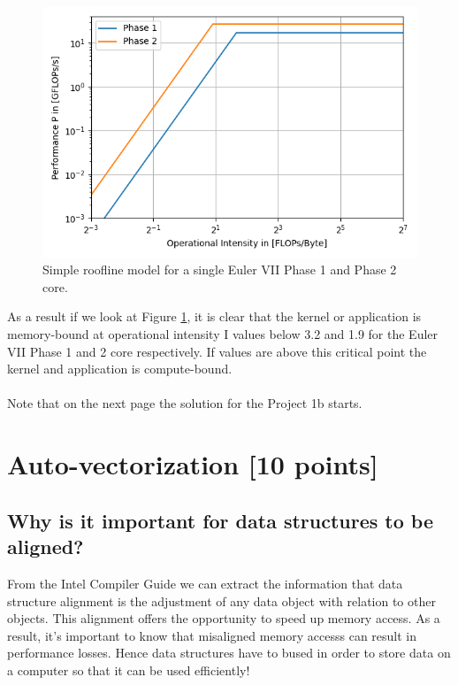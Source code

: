 \documentclass[unicode,11pt,a4paper,oneside,numbers=endperiod,openany]{scrartcl}
\begin{document}
\begin{figure}[H]
    \centering
    \includegraphics[width=\textwidth]{Images/performance.png}
    \caption{Simple roofline model for a single Euler VII Phase 1 and Phase 2 core.}
    \label{fig:performance}
\end{figure}
As a result if we look at Figure \ref{fig:performance}, it is clear that the kernel or application is memory-bound at 
operational intensity I values below 3.2 and 1.9 for the Euler VII Phase 1 and 2 core respectively. If values are above
this critical point the kernel and application is compute-bound. \\ \\
Note that on the next page the solution for the Project 1b starts.

\newpage
\section{Auto-vectorization [10 points]}

\subsection{Why is it important for data structures to be aligned?}
From the Intel Compiler Guide \cite{autovectorization} we can extract the information that data 
structure alignment is the adjustment of any data object with relation to other objects. This alignment 
offers the opportunity to speed up memory access. As a result, it's important to know that misaligned memory accesss 
can result in performance losses. Hence data structures have to bused in order to store data on a computer so that it can be used efficiently!
\end{document}
